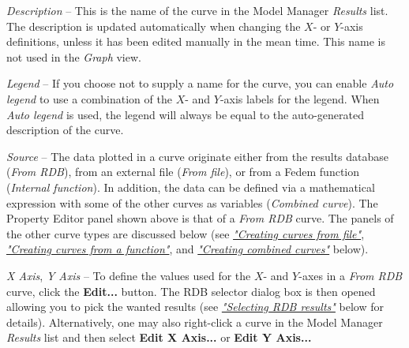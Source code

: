 \begin{bulletlist}
\item{\sl Description} --
  This is the name of the curve in the Model Manager {\sl Results} list.
  The description is updated automatically when changing the $X$- or $Y$-axis
  definitions, unless it has been edited manually in the mean time.
  This name is not used in the {\sl Graph} view.


\item{\sl Legend} --
  If you choose not to supply a name for the curve, you can enable
  {\sl Auto legend} to use a combination of the $X$- and $Y$-axis labels for the
  legend. When {\sl Auto legend} is used, the legend will always be equal to the
  auto-generated description of the curve.


\item{\sl Source} --
  The data plotted in a curve originate either from the results database
  ({\sl From RDB}), from an external file ({\sl From file}),
  or from a Fedem function ({\sl Internal function}).
  In addition, the data can be defined via a mathematical expression
  with some of the other curves as variables ({\sl Combined curve}).
  The Property Editor panel shown above is that of a {\sl From RDB} curve.
  The panels of the other curve types are discussed below (see
  \protect\hyperlink{creating-curves-from-file}
                    {\sl"Creating curves from file"},
  \protect\hyperlink{creating-curves-from-a-function}
                    {\sl"Creating curves from a function"}, and
  \protect\hyperlink{creating-combined-curves}
                    {\sl"Creating combined curves"} below).

\item{\sl X Axis}, {\sl Y Axis} --
  To define the values used for the $X$- and $Y$-axes in a {\sl From RDB} curve,
  click the \textbf{Edit...} button. The RDB selector dialog box is then opened
  allowing you to pick the wanted results (see
  \protect\hyperlink{selecting-rdb-results}{\sl"Selecting RDB results"}
  below for details). Alternatively, one may also right-click a curve in the
  Model Manager {\sl Results} list and then select \textbf{Edit X Axis...}
  or \textbf{Edit Y Axis...}


\end{bulletlist}
